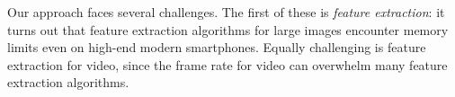 


%
Our approach faces several challenges.
%
The first of these is \emph{feature extraction}: it turns out that
feature extraction algorithms for large images encounter memory limits
even on high-end modern smartphones.
%
Equally challenging is feature extraction for video, since the frame
rate for video can overwhelm many feature extraction algorithms.

